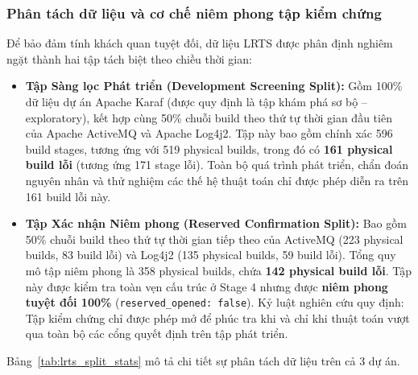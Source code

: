 \subsubsection{Phân tách dữ liệu và cơ chế niêm phong tập kiểm chứng}
\label{subsubsec:data_splits}

Để bảo đảm tính khách quan tuyệt đối, dữ liệu LRTS được phân định nghiêm ngặt thành hai tập tách biệt theo chiều thời gian:
\begin{itemize}
    \item \textbf{Tập Sàng lọc Phát triển (Development Screening Split):} Gồm 100\% dữ liệu dự án Apache Karaf (được quy định là tập khám phá sơ bộ -- exploratory), kết hợp cùng 50\% chuỗi build theo thứ tự thời gian đầu tiên của Apache ActiveMQ và Apache Log4j2.
    Tập này bao gồm chính xác 596 build stages, tương ứng với 519 physical builds, trong đó có \textbf{161 physical build lỗi} (tương ứng 171 stage lỗi). Toàn bộ quá trình phát triển, chẩn đoán nguyên nhân và thử nghiệm các thế hệ thuật toán chỉ được phép diễn ra trên 161 build lỗi này.
    \item \textbf{Tập Xác nhận Niêm phong (Reserved Confirmation Split):} Bao gồm 50\% chuỗi build theo thứ tự thời gian tiếp theo của ActiveMQ (223 physical builds, 83 build lỗi) và Log4j2 (135 physical builds, 59 build lỗi).
    Tổng quy mô tập niêm phong là 358 physical builds, chứa \textbf{142 physical build lỗi}.
    Tập này được kiểm tra toàn vẹn cấu trúc ở Stage 4 nhưng được \textbf{niêm phong tuyệt đối 100\%} (\texttt{reserved\_opened: false}). Kỷ luật nghiên cứu quy định: Tập kiểm chứng chỉ được phép mở để phúc tra khi và chỉ khi thuật toán vượt qua toàn bộ các cổng quyết định trên tập phát triển.
\end{itemize}

Bảng~\ref{tab:lrts_split_stats} mô tả chi tiết sự phân tách dữ liệu trên cả 3 dự án.

